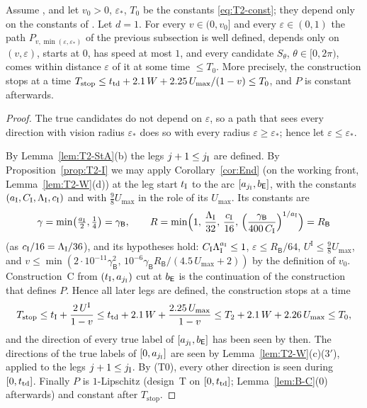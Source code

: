 \begin{proposition}\label{prop:T2-cond}
Assume \MHT, and let $v_0>0$, $\varepsilon_*$, $T_0$ be the constants \eqref{eq:T2-const}; they depend only on the constants of
\MHT. Let $d=1$. For every $v\in(0,v_0]$ and every $\varepsilon\in(0,1)$ the path $P_{v,\min(\varepsilon,\varepsilon_*)}$ of the
previous subsection is well defined, depends only on $(v,\varepsilon)$, starts at $0$, has speed at most $1$, and every candidate
$S_\theta$, $\theta\in[0,2\pi)$, comes within distance $\varepsilon$ of it at some time $\le T_0$. More precisely, the
construction stops at a time $T_{\mathrm{stop}}\le t_{\mathrm{td}}+2.1\,W+2.25\,U_{\max}/(1-v)\le T_0$, and $P$ is constant afterwards.
\end{proposition}
\begin{proof}
The true candidates do not depend on $\varepsilon$, so a path that sees every direction with vision radius $\varepsilon_*$ does so
with every radius $\varepsilon\ge\varepsilon_*$; hence let $\varepsilon\le\varepsilon_*$.

By Lemma~\ref{lem:T2-StA}(b) the legs $j+1\le j_{\mathrm I}$ are defined. By Proposition~\ref{prop:T2-I} we may apply
Corollary~\ref{cor:End} (on the working front, Lemma~\ref{lem:T2-W}(d)) at the leg start $t_{\mathrm I}$ to the arc $[a_{j_{\mathrm I}},b_{\mathsf E}]$, with
the constants $(a_{\mathrm I},C_{\mathrm I},\Lambda_{\mathrm I},c_{\mathrm I})$ and with $\frac98U_{\max}$ in the role of its $U_{\max}$. Its constants are
\[
\gamma=\min\bigl(\tfrac{a_{\mathrm I}}2,\tfrac14\bigr)=\gamma_{\mathsf B},\qquad
R=\min\Bigl(1,\,\frac{\Lambda_{\mathrm I}}{32},\,\frac{c_{\mathrm I}}{16},\,\Bigl(\frac{\gamma_{\mathsf B}}{400\,C_{\mathrm I}}\Bigr)^{1/a_{\mathrm I}}\Bigr)=R_{\mathsf B}
\]
(as $c_{\mathrm I}/16=\Lambda_{\mathrm I}/36$), and its hypotheses hold: $C_{\mathrm I}\Lambda_{\mathrm I}^{a_{\mathrm I}}\le1$, $\varepsilon\le R_{\mathsf B}/64$,
$U^{\mathrm I}\le\frac98U_{\max}$, and
$v\le\min(2\cdot10^{-11}\gamma_{\mathsf B}^2,\,10^{-6}\gamma_{\mathsf B}R_{\mathsf B}/(4.5\,U_{\max}+2))$ by the definition of
$v_0$. Construction~C from $(t_{\mathrm I},a_{j_{\mathrm I}})$ cut at $b_{\mathsf E}$ is the continuation of the construction that defines $P$. Hence all
later legs are defined, the construction stops at a time
\[
T_{\mathrm{stop}}\le t_{\mathrm I}+\frac{2\,U^{\mathrm I}}{1-v}\le t_{\mathrm{td}}+2.1\,W+\frac{2.25\,U_{\max}}{1-v}\le T_2+2.1\,W+2.26\,U_{\max}\le T_0,
\]
and the direction of every true label of $[a_{j_{\mathrm I}},b_{\mathsf E}]$ has been seen by then. The directions of the true labels of
$[0,a_{j_{\mathrm I}}]$ are seen by Lemma~\ref{lem:T2-W}(c)\textup{($3'$)}, applied to the legs $j+1\le j_{\mathrm I}$. By (T0), every other
direction is seen during $[0,t_{\mathrm{td}}]$. Finally $P$ is $1$-Lipschitz (design~T on $[0,t_{\mathrm{td}}]$; Lemma~\ref{lem:B-C}(0) afterwards) and
constant after $T_{\mathrm{stop}}$.
\end{proof}

